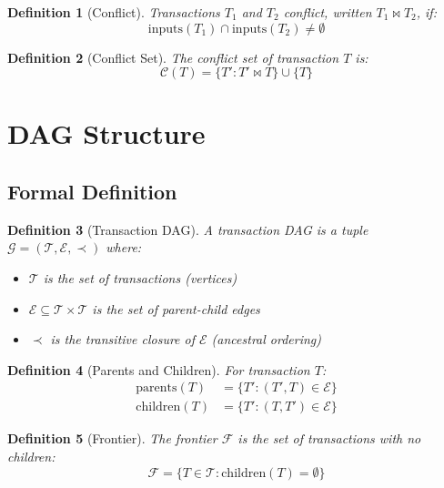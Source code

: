 \documentclass[11pt,a4paper]{article}
\newtheorem{definition}{Definition}
\begin{document}
\begin{definition}[Conflict]
Transactions $T_1$ and $T_2$ conflict, written $T_1 \bowtie T_2$, if:
\begin{equation}
\text{inputs}(T_1) \cap \text{inputs}(T_2) \neq \emptyset
\end{equation}
\end{definition}

\begin{definition}[Conflict Set]
The conflict set of transaction $T$ is:
\begin{equation}
\mathcal{C}(T) = \{T' : T' \bowtie T\} \cup \{T\}
\end{equation}
\end{definition}

\section{DAG Structure}

\subsection{Formal Definition}

\begin{definition}[Transaction DAG]
A transaction DAG is a tuple $\mathcal{G} = (\mathcal{T}, \mathcal{E}, \prec)$ where:
\begin{itemize}
    \item $\mathcal{T}$ is the set of transactions (vertices)
    \item $\mathcal{E} \subseteq \mathcal{T} \times \mathcal{T}$ is the set of parent-child edges
    \item $\prec$ is the transitive closure of $\mathcal{E}$ (ancestral ordering)
\end{itemize}
\end{definition}

\begin{definition}[Parents and Children]
For transaction $T$:
\begin{align}
\text{parents}(T) &= \{T' : (T', T) \in \mathcal{E}\} \\
\text{children}(T) &= \{T' : (T, T') \in \mathcal{E}\}
\end{align}
\end{definition}

\begin{definition}[Frontier]
The frontier $\mathcal{F}$ is the set of transactions with no children:
\begin{equation}
\mathcal{F} = \{T \in \mathcal{T} : \text{children}(T) = \emptyset\}
\end{equation}
\end{definition}
\end{document}
